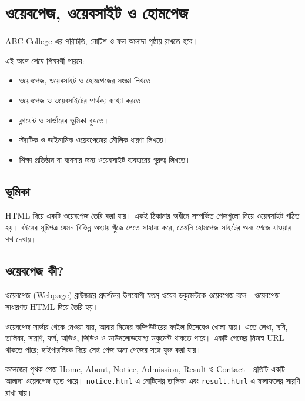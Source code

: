 \section{ওয়েবপেজ, ওয়েবসাইট ও হোমপেজ}

ABC College-এর পরিচিতি, নোটিশ ও ফল আলাদা পৃষ্ঠায় রাখতে হবে।



\begin{learningbox}
এই অংশ শেষে শিক্ষার্থী পারবে:
\begin{itemize}
\item ওয়েবপেজ, ওয়েবসাইট ও হোমপেজের সংজ্ঞা লিখতে।
\item ওয়েবপেজ ও ওয়েবসাইটের পার্থক্য ব্যাখ্যা করতে।
\item ক্লায়েন্ট ও সার্ভারের ভূমিকা বুঝতে।
\item স্ট্যাটিক ও ডাইনামিক ওয়েবপেজের মৌলিক ধারণা লিখতে।
\item শিক্ষা প্রতিষ্ঠান বা ব্যবসার জন্য ওয়েবসাইট ব্যবহারের গুরুত্ব লিখতে।
\end{itemize}
\end{learningbox}

\subsection{ভূমিকা}
HTML দিয়ে একটি ওয়েবপেজ তৈরি করা যায়। একই ঠিকানার অধীনে সম্পর্কিত পেজগুলো নিয়ে ওয়েবসাইট গঠিত হয়। বইয়ের সূচিপত্র যেমন বিভিন্ন অধ্যায় খুঁজে পেতে সাহায্য করে, তেমনি হোমপেজ সাইটের অন্য পেজে যাওয়ার পথ দেখায়।

\subsection{ওয়েবপেজ কী?}
\begin{definitionbox}{ওয়েবপেজ (Webpage)}
ব্রাউজারে প্রদর্শনের উপযোগী স্বতন্ত্র ওয়েব ডকুমেন্টকে ওয়েবপেজ বলে। ওয়েবপেজ সাধারণত HTML দিয়ে তৈরি হয়।
\end{definitionbox}
ওয়েবপেজ সার্ভার থেকে নেওয়া যায়, আবার নিজের কম্পিউটারের ফাইল হিসেবেও খোলা যায়। এতে লেখা, ছবি, তালিকা, সারণি, ফর্ম, অডিও, ভিডিও ও ডাউনলোডযোগ্য ডকুমেন্ট থাকতে পারে। একটি পেজের নিজস্ব URL থাকতে পারে; হাইপারলিংক দিয়ে সেই পেজ অন্য পেজের সঙ্গে যুক্ত করা যায়।
\begin{examplebox}{কলেজের পৃথক পেজ}
Home, About, Notice, Admission, Result ও Contact—প্রতিটি একটি আলাদা ওয়েবপেজ হতে পারে। \texttt{notice.html}-এ নোটিশের তালিকা এবং \texttt{result.html}-এ ফলাফলের সারণি রাখা যায়।
\end{examplebox}

